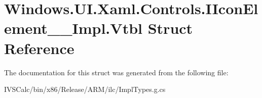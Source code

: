 \hypertarget{struct_windows_1_1_u_i_1_1_xaml_1_1_controls_1_1_i_icon_element_____impl_1_1_vtbl}{}\section{Windows.\+U\+I.\+Xaml.\+Controls.\+I\+Icon\+Element\+\_\+\+\_\+\+Impl.\+Vtbl Struct Reference}
\label{struct_windows_1_1_u_i_1_1_xaml_1_1_controls_1_1_i_icon_element_____impl_1_1_vtbl}


The documentation for this struct was generated from the following file\+:\begin{DoxyCompactItemize}
\item 
I\+V\+S\+Calc/bin/x86/\+Release/\+A\+R\+M/ilc/Impl\+Types.\+g.\+cs\end{DoxyCompactItemize}
